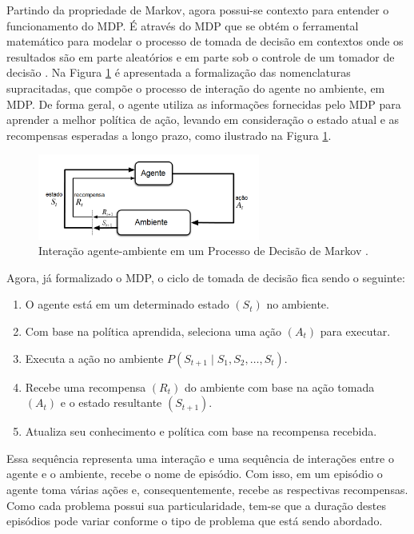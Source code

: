 Partindo da propriedade de Markov, agora possui-se contexto para entender o funcionamento do MDP. É através do MDP que se obtém o ferramental matemático para modelar o processo de tomada de decisão em contextos onde os resultados são em parte aleatórios e em parte sob o controle de um tomador de decisão \cite{sutton}. Na Figura \ref{fig:MDP} é apresentada a formalização das nomenclaturas supracitadas, que compõe o processo de interação do agente no ambiente, em MDP. De forma geral, o agente utiliza as informações fornecidas pelo MDP para aprender a melhor política de ação, levando em consideração o estado atual e as recompensas esperadas a longo prazo, como ilustrado na Figura \ref{fig:MDP}.

\begin{figure}[H]
 \centering
 \includegraphics[width=0.65\textwidth]{./fig/MDP.png}

 \caption{Interação agente-ambiente em um Processo de Decisão
de Markov \cite{sutton}.}
 \label{fig:MDP}
\end{figure}


Agora, já formalizado o MDP, o ciclo de tomada de decisão fica sendo o seguinte:

\begin{enumerate}
\item O agente está em um determinado estado $(S_t)$ no ambiente.
\item Com base na política aprendida, seleciona uma ação $(A_t)$ para executar.
\item Executa a ação no ambiente $P(S_{t+1} \mid S_1, S_2, \ldots, S_t)$.
\item Recebe uma recompensa $(R_t)$ do ambiente com base na ação tomada  $(A_t)$ e o estado resultante $(S_{t+1})$.
\item Atualiza seu conhecimento e política com base na recompensa recebida.
\end{enumerate}

Essa sequência representa uma interação e uma sequência de interações entre o agente e o ambiente, recebe o nome de episódio. Com isso, em um episódio o agente toma várias ações e, consequentemente, recebe as respectivas recompensas. Como cada problema possui sua particularidade, tem-se que a duração destes episódios pode variar conforme o tipo de problema que está sendo abordado.
